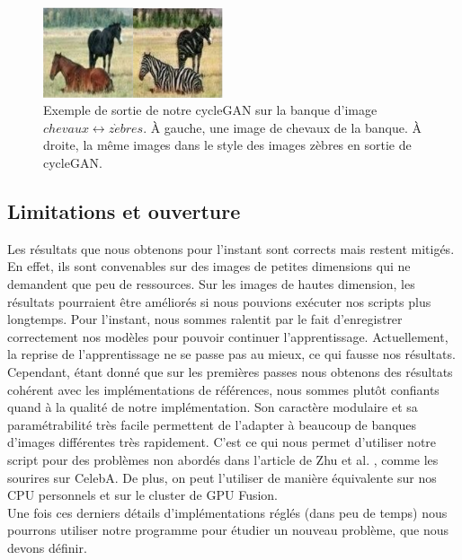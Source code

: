 \begin{figure}[!h]
\centering
\includegraphics[width=150pt]{"images/cycleRes3"}
\caption{Exemple de sortie de notre cycleGAN sur la banque d'image $chevaux \leftrightarrow z\grave{e}bres$. À gauche, une image de chevaux de la banque. À droite, la même images dans le style des images zèbres en sortie de cycleGAN.}
\label{exemple_zebres}
\end{figure}

\subsection{Limitations et ouverture}

Les résultats que nous obtenons pour l'instant sont corrects mais restent mitigés. En effet, ils sont convenables sur des images de petites dimensions qui ne demandent que peu de ressources. Sur les images de hautes dimension, les résultats pourraient être améliorés si nous pouvions exécuter nos scripts plus longtemps. Pour l'instant, nous sommes ralentit par le fait d'enregistrer correctement nos modèles pour pouvoir continuer l'apprentissage. Actuellement, la reprise de l'apprentissage ne se passe pas au mieux, ce qui fausse nos résultats.\\

Cependant, étant donné que sur les premières passes nous obtenons des résultats cohérent avec les implémentations de références, nous sommes plutôt confiants quand à la qualité de notre implémentation. Son caractère modulaire et sa paramétrabilité très facile permettent de l'adapter à beaucoup de banques d'images différentes très rapidement. C'est ce qui nous permet d'utiliser notre script pour des problèmes non abordés dans l'article de Zhu et al. \cite{zhu_unpaired_2018}, comme les sourires sur CelebA. De plus, on peut l'utiliser de manière équivalente sur nos CPU personnels et sur le cluster de GPU Fusion.\\

Une fois ces derniers détails d'implémentations réglés (dans peu de temps) nous pourrons utiliser notre programme pour étudier un nouveau problème, que nous devons définir.

